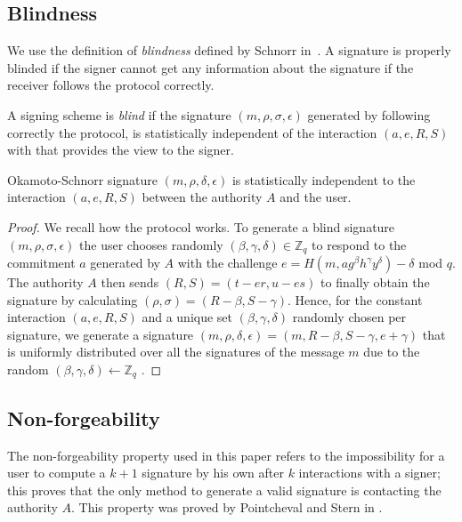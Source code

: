 \documentclass[conference]{llncs}
\begin{document}
\subsection{Blindness}

We use the definition of \emph{blindness} defined by Schnorr in~\cite{schnorr2001security}. A signature is properly blinded if the signer cannot get any information about the signature if the receiver follows the protocol correctly.

\begin{definition}
A signing scheme is \emph{blind} if the signature $(m,\rho,\sigma,\epsilon)$ generated by following correctly the protocol, is statistically independent of the interaction $(a,e,R,S)$ with that provides the view to the signer.
\end{definition}

\begin{theorem}
Okamoto-Schnorr signature $(m,\rho,\delta,\epsilon)$ is statistically independent to the interaction $(a,e,R,S)$ between the authority $A$ and the user.
\end{theorem}

\begin{proof}
We recall how the protocol works. To generate a blind signature $(m,\rho,\sigma,\epsilon)$ the user chooses randomly $(\beta,\gamma,\delta)\in \mathbb{Z}_q$ to respond to the commitment $a$ generated by $A$ with the challenge $e=H(m,ag^\beta h^\gamma y^\delta) -\delta$ mod $q$. The authority $A$ then sends $(R,S)=(t-er,u-es)$ to finally obtain the signature by calculating $(\rho,\sigma)=(R-\beta,S-\gamma)$.
Hence, for the constant interaction $(a,e,R,S)$ and a unique set $(\beta,\gamma,\delta)$ randomly chosen per signature, we generate a signature $(m,\rho,\delta,\epsilon)=(m,R-\beta,S-\gamma,e+\gamma)$ that is uniformly distributed over all the signatures of the message $m$ due to the random $(\beta,\gamma,\delta) \gets \mathbb{Z}_q$ \cite{schnorr2001security}.
\end{proof}

\subsection{Non-forgeability}
The non-forgeability property used in this paper refers to the impossibility for a user to compute a $k+1$ signature by his own after $k$ interactions with a signer; this proves that the only method to generate a valid signature is contacting the authority $A$. This property was proved by Pointcheval and Stern in \cite{pointcheval1996provably}.
\end{document}
